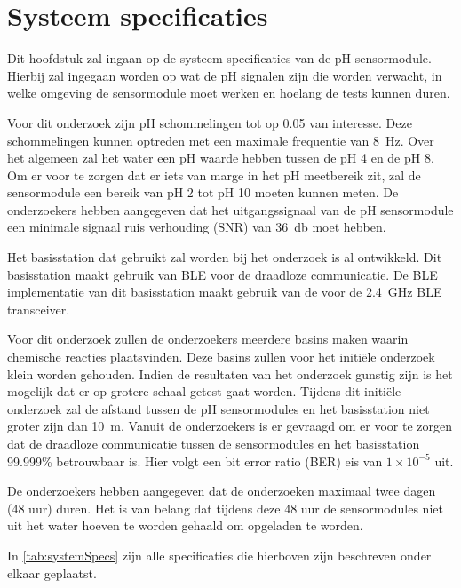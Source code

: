 \section{Systeem specificaties}\label{sec:systemSpecifications}

Dit hoofdstuk zal ingaan op de systeem specificaties van de pH sensormodule. Hierbij zal ingegaan worden op wat de pH signalen zijn die worden verwacht, in welke omgeving de sensormodule moet werken en hoelang de tests kunnen duren.

Voor dit onderzoek zijn pH schommelingen tot op \qty{0.05}{\pH} van interesse. Deze schommelingen kunnen optreden met een maximale frequentie van \qty{8}{\hertz}. Over het algemeen zal het water een pH waarde hebben tussen de pH 4 en de pH 8. Om er voor te zorgen dat er iets van marge in het pH meetbereik zit, zal de sensormodule een bereik van pH 2 tot pH 10 moeten kunnen meten. De onderzoekers hebben aangegeven dat het uitgangssignaal van de pH sensormodule een minimale signaal ruis verhouding (SNR) van \qty{36}{\decibel} moet hebben.

Het basisstation dat gebruikt zal worden bij het onderzoek is al ontwikkeld. Dit basisstation maakt gebruik van BLE voor de draadloze communicatie. De BLE implementatie van dit basisstation maakt gebruik van de \mcu voor de \qty{2.4}{\giga\hertz} BLE transceiver.

Voor dit onderzoek zullen de onderzoekers meerdere basins maken waarin chemische reacties plaatsvinden. Deze basins zullen voor het initiële onderzoek klein worden gehouden. Indien de resultaten van het onderzoek gunstig zijn is het mogelijk dat er op grotere schaal getest gaat worden. Tijdens dit initiële onderzoek zal de afstand tussen de pH sensormodules en het basisstation niet groter zijn dan \qty{10}{\meter}. Vanuit de onderzoekers is er gevraagd om er voor te zorgen dat de draadloze communicatie tussen de sensormodules en het basisstation 99.999\% betrouwbaar is. Hier volgt een bit error ratio (BER) eis van $1\times 10^{-5}$ uit.

De onderzoekers hebben aangegeven dat de onderzoeken maximaal twee dagen (48 uur) duren. Het is van belang dat tijdens deze 48 uur de sensormodules niet uit het water hoeven te worden gehaald om opgeladen te worden.


In \cref{tab:systemSpecs} zijn alle specificaties die hierboven zijn beschreven onder elkaar geplaatst.

